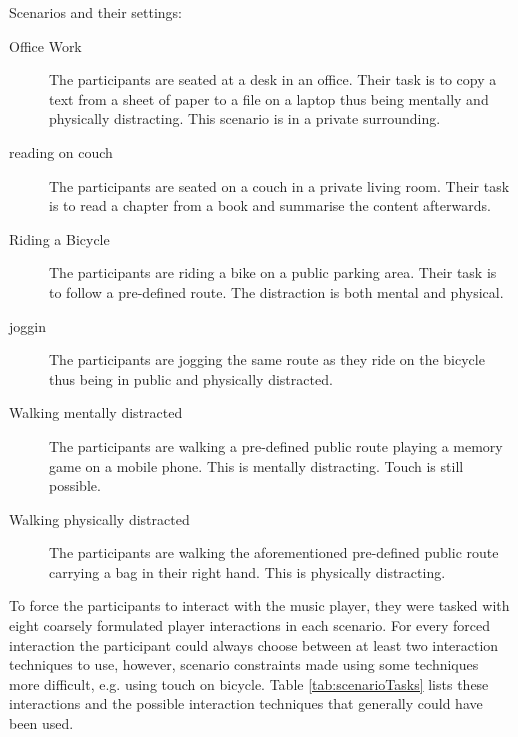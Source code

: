 Scenarios and their settings:
\begin{description}
	\item[Office Work]{The participants are seated at a desk in an office. Their task is to copy a text from a sheet of paper to a file on a laptop thus being mentally and physically distracting. This scenario is in a private surrounding.}
	\item[reading on couch]{The participants are seated on a couch in a private living room. Their task is to read a chapter from a book and summarise the content afterwards.}
	\item[Riding a Bicycle]{The participants are riding a bike on a public parking area. Their task is to follow a pre-defined route. The distraction is both mental and physical.}
	\item[joggin]{The participants are jogging the same route as they ride on the bicycle thus being in public and physically distracted.}
	\item[Walking mentally distracted]{The participants are walking a pre-defined public route playing a memory game on a mobile phone. This is mentally distracting. Touch is still possible.}
	\item[Walking physically distracted]{The participants are walking the aforementioned pre-defined public route carrying a bag in their right hand. This is physically distracting.}
\end{description}

To force the participants to interact with the music player, they were tasked with eight coarsely formulated player interactions in each scenario. For every forced interaction the participant could always choose between at least two interaction techniques to use, however, scenario constraints made using some techniques more difficult, e.g. using touch on bicycle. Table \ref{tab:scenarioTasks} lists these interactions and the possible interaction techniques that generally could have been used.

